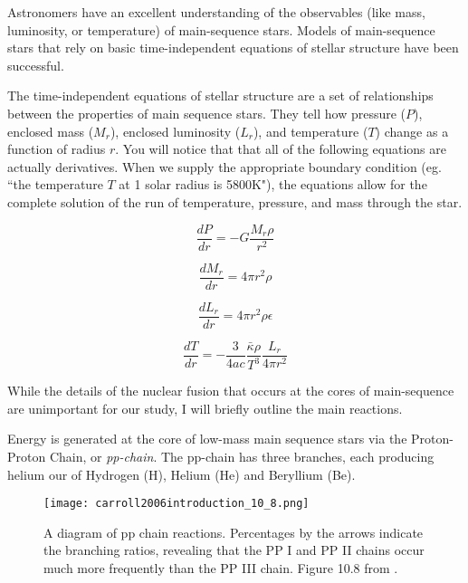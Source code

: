 \documentclass[12pt]{article} %
\numberwithin{equation}{section} %
\begin{document}
Astronomers have an excellent understanding of the observables (like mass, luminosity, or temperature) of main-sequence stars. Models of main-sequence stars that rely on basic time-independent equations of stellar structure have been successful.

The time-independent equations of stellar structure  are a set of relationships between the properties of main sequence stars. They tell how pressure ($P$), enclosed mass ($M_{r}$), enclosed luminosity ($L_{r}$), and temperature ($T$) change as a function of radius $r$. You will notice that that all of the following equations are actually derivatives. When we supply the appropriate boundary condition (eg. ``the temperature $T$ at 1 solar radius is 5800K"), the equations allow for the complete solution of the run of temperature, pressure, and mass through the star.

\begin{equation} \label{stellar_structure1}
\frac{dP}{dr} = -G \frac{M_{r} \rho}{r^{2}} 
\end{equation}

\begin{equation} \label{stellar_structure2}
\frac{dM_{r}}{dr} = 4 \pi r^{2} \rho
\end{equation}

\begin{equation} \label{stellar_structure3}
\frac{dL_{r}}{dr} = 4 \pi r^{2} \rho \epsilon
\end{equation}

\begin{equation} \label{stellar_structure4}
\frac{dT}{dr} = - \frac{3}{4ac} \frac{\bar{\kappa} \rho}{T^{3}} \frac{L_{r}}{4 \pi r^{2}}
\end{equation}

While the details of the nuclear fusion that occurs at the cores of main-sequence are unimportant for our study, I will briefly outline the main reactions.

Energy is generated at the core of low-mass main sequence stars via the Proton-Proton Chain, or \emph{pp-chain}. The pp-chain has three branches, each producing helium our of Hydrogen (H), Helium (He) and Beryllium (Be). 

\begin{figure}[H]
\centering
\texttt{[image: carroll2006introduction\_10\_8.png]}
\caption{A diagram of pp chain reactions. Percentages by the arrows indicate the branching ratios, revealing that the PP I and PP II chains occur much more frequently than the PP III chain. Figure 10.8 from \citet{carroll2006introduction}.}
\label{fig: carroll2006introduction_10_8}
\end{figure}
\end{document}
